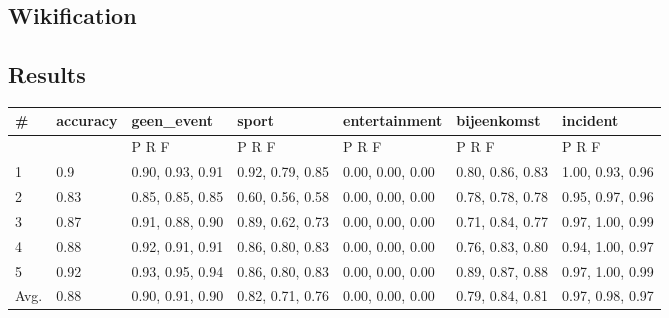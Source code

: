 \documentclass[
10pt, %
a4paper, %
oneside, %
headinclude,footinclude, %
BCOR5mm, %
]{scrartcl}
\begin{document}
\subsection{Wikification}
\lipsum[13] %

\subsection{Results}
\lipsum[7] %

\begin{tabular}{lllllll}
\hline
 \#    & accuracy   & geen\_event       & sport            & entertainment    & bijeenkomst      & incident         \\
\hline
      &            & P     R     F    & P     R     F    & P     R     F    & P     R     F    & P     R     F    \\
 1    & 0.9        & 0.90, 0.93, 0.91 & 0.92, 0.79, 0.85 & 0.00, 0.00, 0.00 & 0.80, 0.86, 0.83 & 1.00, 0.93, 0.96 \\
 2    & 0.83       & 0.85, 0.85, 0.85 & 0.60, 0.56, 0.58 & 0.00, 0.00, 0.00 & 0.78, 0.78, 0.78 & 0.95, 0.97, 0.96 \\
 3    & 0.87       & 0.91, 0.88, 0.90 & 0.89, 0.62, 0.73 & 0.00, 0.00, 0.00 & 0.71, 0.84, 0.77 & 0.97, 1.00, 0.99 \\
 4    & 0.88       & 0.92, 0.91, 0.91 & 0.86, 0.80, 0.83 & 0.00, 0.00, 0.00 & 0.76, 0.83, 0.80 & 0.94, 1.00, 0.97 \\
 5    & 0.92       & 0.93, 0.95, 0.94 & 0.86, 0.80, 0.83 & 0.00, 0.00, 0.00 & 0.89, 0.87, 0.88 & 0.97, 1.00, 0.99 \\
 Avg. & 0.88       & 0.90, 0.91, 0.90 & 0.82, 0.71, 0.76 & 0.00, 0.00, 0.00 & 0.79, 0.84, 0.81 & 0.97, 0.98, 0.97 \\
\hline
\end{tabular}



\end{document}
